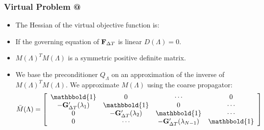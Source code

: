 \documentclass[9pt]{beamer}
\makeatletter
\newcommand*{\rom}[1]{\expandafter\@slowromancap\romannumeral #1@}
\makeatother
\begin{document}
\begin{frame}
\frametitle{Virtual Problem \rom{2}}
\begin{itemize}
\item{The Hessian of the virtual objective function is:
}
\item<2->{If the governing equation of {\tiny$\bold F_{\Delta T}$} is linear {\small$D(\Lambda)=0$}.}
\item<3->{$M(\Lambda)^TM(\Lambda)$ is a symmetric positive definite matrix.}
\item<4->{We base the preconditioner $Q_{\Lambda}$ on an approximation of the inverse of {$M(\Lambda)^TM(\Lambda)$}. We approximate $M(\Lambda)$ using the coarse propagator:
\begin{align*}
\bar M(\Lambda)= \left[ \begin{array}{cccc}
   \mathbbold{1} & 0 & \cdots & 0 \\  
   -\bold{G}_{\Delta T}'(\lambda_{1}) & \mathbbold{1} & 0 & \cdots \\ 
   0 &-\bold{G}_{\Delta T}'(\lambda_{2}) & \mathbbold{1}  & \cdots \\
   0 &\cdots &-\bold{G}_{\Delta T}'(\lambda_{N-1}) & \mathbbold{1}  \\
   \end{array}  \right]
\end{align*}}
\end{itemize}
\end{frame}
\end{document}

